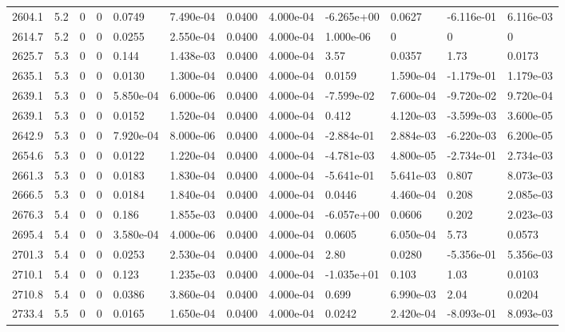 \documentclass[preview]{standalone}
\begin{document}
{{{{{{{\begin{tabular}{L{1.2cm}C{1.2cm} C{0.3cm}C{0.5cm} C{1.4cm}C{1.4cm} C{1.4cm}C{1.4cm} C{1.6cm}C{1.6cm} C{1.6cm}C{1.6cm}}
  2604.1  &   5.2  & 0     &  0 &  0.0749  & 7.490e-04  &  0.0400&   4.000e-04& -6.265e+00 & 0.0627   &  -6.116e-01 & 6.116e-03  \\ 
  2614.7  &   5.2  & 0     &  0 &  0.0255  & 2.550e-04  &  0.0400&   4.000e-04& 1.000e-06 & 0   &  0 & 0  \\ 
  2625.7  &   5.3  & 0     &  0 &  0.144  & 1.438e-03  &  0.0400&   4.000e-04& 3.57 & 0.0357   &  1.73 & 0.0173  \\ 
  2635.1  &   5.3  & 0     &  0 &  0.0130  & 1.300e-04  &  0.0400&   4.000e-04& 0.0159 & 1.590e-04   &  -1.179e-01 & 1.179e-03  \\ 
  2639.1  &   5.3  & 0     &  0 &  5.850e-04  & 6.000e-06  &  0.0400&   4.000e-04& -7.599e-02 & 7.600e-04   &  -9.720e-02 & 9.720e-04  \\ 
  2639.1  &   5.3  & 0     &  0 &  0.0152  & 1.520e-04  &  0.0400&   4.000e-04& 0.412 & 4.120e-03   &  -3.599e-03 & 3.600e-05  \\ 
  2642.9  &   5.3  & 0     &  0 &  7.920e-04  & 8.000e-06  &  0.0400&   4.000e-04& -2.884e-01 & 2.884e-03   &  -6.220e-03 & 6.200e-05  \\ 
  2654.6  &   5.3  & 0     &  0 &  0.0122  & 1.220e-04  &  0.0400&   4.000e-04& -4.781e-03 & 4.800e-05   &  -2.734e-01 & 2.734e-03  \\ 
  2661.3  &   5.3  & 0     &  0 &  0.0183  & 1.830e-04  &  0.0400&   4.000e-04& -5.641e-01 & 5.641e-03   &  0.807 & 8.073e-03  \\ 
  2666.5  &   5.3  & 0     &  0 &  0.0184  & 1.840e-04  &  0.0400&   4.000e-04& 0.0446 & 4.460e-04   &  0.208 & 2.085e-03  \\ 
  2676.3  &   5.4  & 0     &  0 &  0.186  & 1.855e-03  &  0.0400&   4.000e-04& -6.057e+00 & 0.0606   &  0.202 & 2.023e-03  \\ 
  2695.4  &   5.4  & 0     &  0 &  3.580e-04  & 4.000e-06  &  0.0400&   4.000e-04& 0.0605 & 6.050e-04   &  5.73 & 0.0573  \\ 
  2701.3  &   5.4  & 0     &  0 &  0.0253  & 2.530e-04  &  0.0400&   4.000e-04& 2.80 & 0.0280   &  -5.356e-01 & 5.356e-03  \\ 
  2710.1  &   5.4  & 0     &  0 &  0.123  & 1.235e-03  &  0.0400&   4.000e-04& -1.035e+01 & 0.103   &  1.03 & 0.0103  \\ 
  2710.8  &   5.4  & 0     &  0 &  0.0386  & 3.860e-04  &  0.0400&   4.000e-04& 0.699 & 6.990e-03   &  2.04 & 0.0204  \\ 
  2733.4  &   5.5  & 0     &  0 &  0.0165  & 1.650e-04  &  0.0400&   4.000e-04& 0.0242 & 2.420e-04   &  -8.093e-01 & 8.093e-03  \\ 

\end{tabular}}}}}}}}
\end{document}
